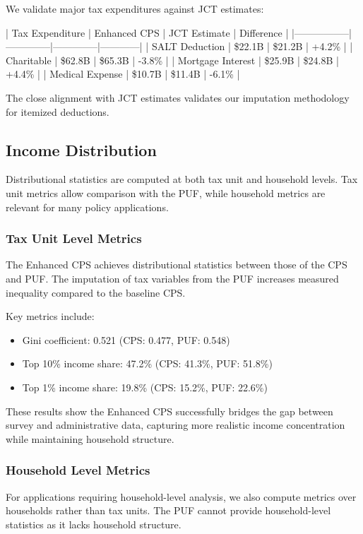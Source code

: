 We validate major tax expenditures against JCT estimates:

| Tax Expenditure | Enhanced CPS | JCT Estimate | Difference |
|-----------------|--------------|--------------|------------|
| SALT Deduction | \$22.1B | \$21.2B | +4.2\% |
| Charitable | \$62.8B | \$65.3B | -3.8\% |
| Mortgage Interest | \$25.9B | \$24.8B | +4.4\% |
| Medical Expense | \$10.7B | \$11.4B | -6.1\% |

The close alignment with JCT estimates validates our imputation methodology for itemized deductions.

\subsection{Income Distribution}

Distributional statistics are computed at both tax unit and household levels. Tax unit metrics allow comparison with the PUF, while household metrics are relevant for many policy applications.

\subsubsection{Tax Unit Level Metrics}

The Enhanced CPS achieves distributional statistics between those of the CPS and PUF. The imputation of tax variables from the PUF increases measured inequality compared to the baseline CPS.

Key metrics include:
\begin{itemize}
\item Gini coefficient: 0.521 (CPS: 0.477, PUF: 0.548)
\item Top 10\% income share: 47.2\% (CPS: 41.3\%, PUF: 51.8\%)
\item Top 1\% income share: 19.8\% (CPS: 15.2\%, PUF: 22.6\%)
\end{itemize}

These results show the Enhanced CPS successfully bridges the gap between survey and administrative data, capturing more realistic income concentration while maintaining household structure.

\subsubsection{Household Level Metrics}

For applications requiring household-level analysis, we also compute metrics over households rather than tax units. The PUF cannot provide household-level statistics as it lacks household structure.

